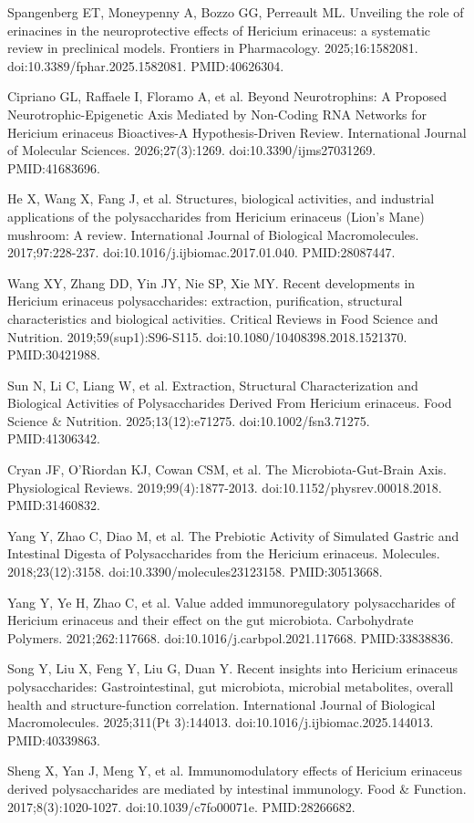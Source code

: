 \documentclass[11pt,oneside]{book}
\newcommand{\reff}[2]{\par\hangindent=7mm\hangafter=1\noindent[#1]\hspace{2mm}#2\par}
\begin{document}
\reff{11}{Spangenberg ET, Moneypenny A, Bozzo GG, Perreault ML. Unveiling the role of erinacines in the neuroprotective effects of Hericium erinaceus: a systematic review in preclinical models. Frontiers in Pharmacology. 2025;16:1582081. doi:10.3389/fphar.2025.1582081. PMID:40626304.}
\reff{12}{Cipriano GL, Raffaele I, Floramo A, et al. Beyond Neurotrophins: A Proposed Neurotrophic-Epigenetic Axis Mediated by Non-Coding RNA Networks for Hericium erinaceus Bioactives-A Hypothesis-Driven Review. International Journal of Molecular Sciences. 2026;27(3):1269. doi:10.3390/ijms27031269. PMID:41683696.}
\reff{13}{He X, Wang X, Fang J, et al. Structures, biological activities, and industrial applications of the polysaccharides from Hericium erinaceus (Lion's Mane) mushroom: A review. International Journal of Biological Macromolecules. 2017;97:228-237. doi:10.1016/j.ijbiomac.2017.01.040. PMID:28087447.}
\reff{14}{Wang XY, Zhang DD, Yin JY, Nie SP, Xie MY. Recent developments in Hericium erinaceus polysaccharides: extraction, purification, structural characteristics and biological activities. Critical Reviews in Food Science and Nutrition. 2019;59(sup1):S96-S115. doi:10.1080/10408398.2018.1521370. PMID:30421988.}
\reff{15}{Sun N, Li C, Liang W, et al. Extraction, Structural Characterization and Biological Activities of Polysaccharides Derived From Hericium erinaceus. Food Science \& Nutrition. 2025;13(12):e71275. doi:10.1002/fsn3.71275. PMID:41306342.}
\reff{16}{Cryan JF, O'Riordan KJ, Cowan CSM, et al. The Microbiota-Gut-Brain Axis. Physiological Reviews. 2019;99(4):1877-2013. doi:10.1152/physrev.00018.2018. PMID:31460832.}
\reff{17}{Yang Y, Zhao C, Diao M, et al. The Prebiotic Activity of Simulated Gastric and Intestinal Digesta of Polysaccharides from the Hericium erinaceus. Molecules. 2018;23(12):3158. doi:10.3390/molecules23123158. PMID:30513668.}
\reff{18}{Yang Y, Ye H, Zhao C, et al. Value added immunoregulatory polysaccharides of Hericium erinaceus and their effect on the gut microbiota. Carbohydrate Polymers. 2021;262:117668. doi:10.1016/j.carbpol.2021.117668. PMID:33838836.}
\reff{19}{Song Y, Liu X, Feng Y, Liu G, Duan Y. Recent insights into Hericium erinaceus polysaccharides: Gastrointestinal, gut microbiota, microbial metabolites, overall health and structure-function correlation. International Journal of Biological Macromolecules. 2025;311(Pt 3):144013. doi:10.1016/j.ijbiomac.2025.144013. PMID:40339863.}
\reff{20}{Sheng X, Yan J, Meng Y, et al. Immunomodulatory effects of Hericium erinaceus derived polysaccharides are mediated by intestinal immunology. Food \& Function. 2017;8(3):1020-1027. doi:10.1039/c7fo00071e. PMID:28266682.}
\end{document}
